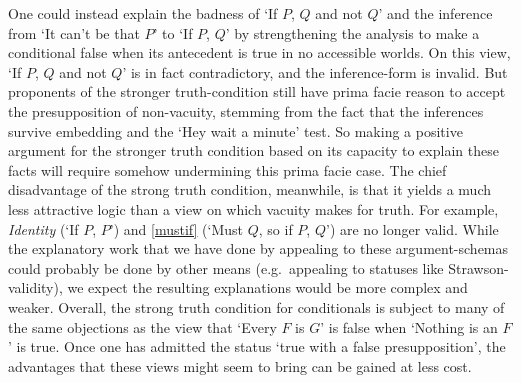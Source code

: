\documentclass[If.tex]{subfiles}
\begin{document}
One could instead explain the badness of ‘If $P$, $Q$ and not $Q$’ and the inference from ‘It can't be that $P$’ to ‘If $P$, $Q$’ by strengthening the analysis to make a conditional false when its antecedent is true in no accessible worlds.  On this view, ‘If $P$, $Q$ and not $Q$’ is in fact contradictory, and the inference-form is invalid.  But proponents of the stronger truth-condition still have prima facie reason to accept the presupposition of non-vacuity, stemming from the fact that the inferences survive embedding and the ‘Hey wait a minute’ test.  So making a positive argument for the stronger truth condition based on its capacity to explain these facts will require somehow undermining this prima facie case.  The chief disadvantage of the strong truth condition, meanwhile, is that it yields a much less attractive logic than a view on which vacuity makes for truth.  For example, \emph{Identity} (‘If $P$, $P$’) and \ref{mustif} (‘Must $Q$, so if $P$, $Q$’) are no longer valid.  While the explanatory work that we have done by appealing to these argument-schemas could probably be done by other means (e.g.\ appealing to statuses like Strawson-validity), we expect the resulting explanations would be more complex and weaker.  Overall, the strong truth condition for conditionals is subject to many of the same objections as the view that ‘Every $F$ is $G$’ is false when ‘Nothing is an $F$’ is true.  Once one has admitted the status ‘true with a false presupposition’, the advantages that these views might seem to bring can be gained at less cost.
\end{document}

